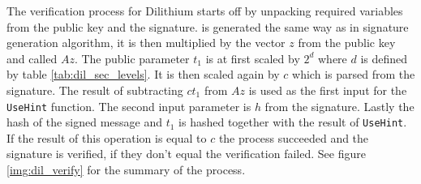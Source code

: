 The verification process for Dilithium starts off by unpacking required variables from the public key and the signature.  is generated the same way as in signature generation algorithm, it is then multiplied by the vector $z$ from the public key and called $Az$. The public parameter $t_1$ is at first scaled by $2^d$ where $d$ is defined by table \ref{tab:dil_sec_levels}. It is then scaled again by $c$ which is parsed from the signature. The result of subtracting $ct_1$ from $Az$ is used as the first input for the \texttt{UseHint} function. The second input parameter is $h$ from the signature. Lastly the hash of the signed message and $t_1$ is hashed together with the result of \texttt{UseHint}. If the result of this operation is equal to $c$ the process succeeded and the signature is verified, if they don't equal the verification failed. See figure \ref{img:dil_verify} for the summary of the process.

